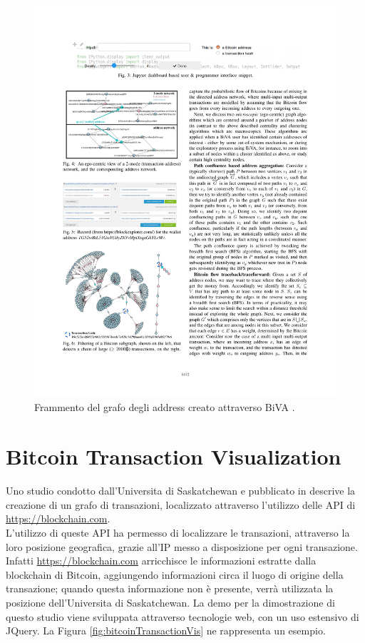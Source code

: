 \begin{figure}
\centering
\includegraphics[scale=1.0]{images/bivaGraph.pdf}
\caption{Frammento del grafo degli address creato attraverso BiVA \cite{DBLP:conf/icdm/OggierPD18}.\label{fig:bivaGraph}}
\end{figure}


\section{Bitcoin Transaction Visualization} \label{sec:bitcoinTransactionVis}

Uno studio condotto dall'Universita di Saskatchewan e pubblicato in \cite{inproceedings} descrive la creazione di un grafo di transazioni, localizzato attraverso l'utilizzo delle API di \url{https://blockchain.com}.\\
L'utilizzo di queste API ha permesso di localizzare le transazioni, attraverso la loro posizione geografica, grazie all'IP messo a disposizione per ogni transazione. Infatti \url{https://blockchain.com} arricchisce le informazioni estratte dalla blockchain di Bitcoin, aggiungendo informazioni circa il luogo di origine della transazione; quando questa informazione non è presente, verrà utilizzata la posizione dell'Universita di Saskatchewan.
La demo per la dimostrazione di questo studio viene sviluppata attraverso tecnologie web, con un uso estensivo di JQuery. La Figura \ref{fig:bitcoinTransactionVis} ne rappresenta un esempio.

